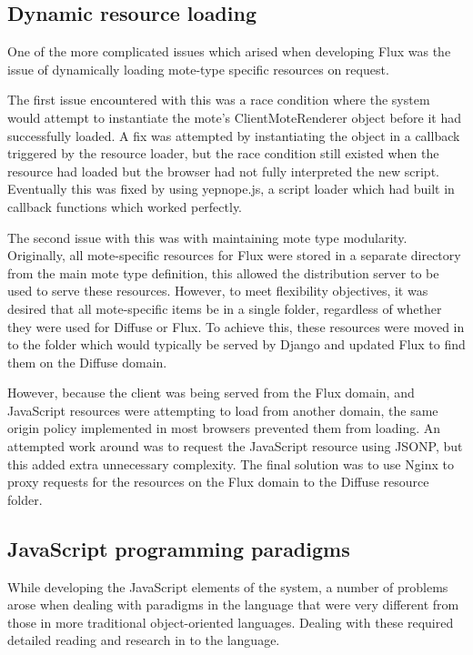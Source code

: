 \documentclass[a4papert,11pt,notitlepage]{article}
\begin{document}
 \subsection{Dynamic resource loading}
One of the more complicated issues which arised when developing Flux was the issue of dynamically loading mote-type specific resources on request. 

The first issue encountered with this was a race condition where the system would attempt to instantiate the mote's ClientMoteRenderer object before it had successfully loaded. A fix was attempted by instantiating the object in a callback triggered by the resource loader, but the race condition still existed when the resource had loaded but the browser had not fully interpreted the new script. Eventually this was fixed by using yepnope.js, a script loader which had built in callback functions which worked perfectly.

The second issue with this was with maintaining mote type modularity. Originally, all mote-specific resources for Flux were stored in a separate directory from the main mote type definition, this allowed the distribution server to be used to serve these resources. However, to meet flexibility objectives, it was desired that all mote-specific items be in a single folder, regardless of whether they were used for Diffuse or Flux. To achieve this, these resources were moved in to the folder which would typically be served by Django and updated Flux to find them on the Diffuse domain. 

However, because the client was being served from the Flux domain, and JavaScript resources were attempting to load from another domain, the same origin policy implemented in most browsers prevented them from loading. An attempted work around was to request the JavaScript resource using JSONP\cite{jsonp:web}, but this added extra unnecessary complexity. The final solution was to use Nginx to proxy requests for the resources on the Flux domain to the Diffuse resource folder.

\subsection{JavaScript programming paradigms}
While developing the JavaScript elements of the system, a number of problems arose when dealing with paradigms in the language that were very different from those in more traditional object-oriented languages. Dealing with these required detailed reading and research in to the language.
\end{document}
